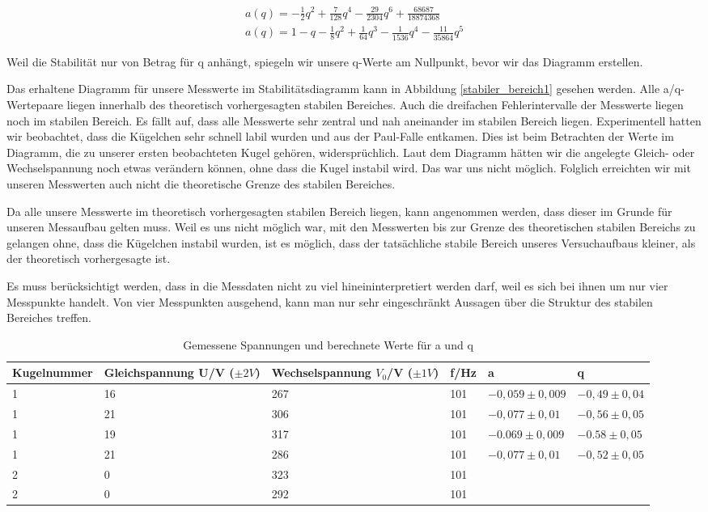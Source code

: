 \documentclass[10pt,a4paper]{article}
\begin{document}
\begin{align}
	a(q) = - \frac{1}{2} q^2 + \frac{7}{128} q^4 - \frac{29}{2304} q^6 + \frac{68687}{18874368}\\
	a(q) = 1-q-\frac{1}{8} q^2 + \frac{1}{64} q^3 - \frac{1}{1536} q^4 - \frac{11}{35864} q^5	
\end{align}

Weil die Stabilität nur von Betrag für q anhängt, spiegeln wir unsere q-Werte am Nullpunkt, bevor wir das Diagramm erstellen. 

Das erhaltene Diagramm für unsere Messwerte im Stabilitätsdiagramm kann in Abbildung \ref{stabiler_bereich1} gesehen werden. Alle a/q-Wertepaare liegen innerhalb des theoretisch vorhergesagten stabilen Bereiches. Auch die dreifachen Fehlerintervalle der Messwerte liegen noch im stabilen Bereich. Es fällt auf, dass alle Messwerte sehr zentral und nah aneinander im stabilen Bereich liegen. Experimentell hatten wir beobachtet, dass die Kügelchen sehr schnell labil wurden und aus der Paul-Falle entkamen. Dies ist beim Betrachten der Werte im Diagramm, die zu unserer ersten beobachteten Kugel gehören, widersprüchlich. Laut dem Diagramm hätten wir die angelegte Gleich- oder Wechselspannung noch etwas verändern können, ohne dass die Kugel instabil wird. Das war uns nicht möglich. Folglich erreichten wir mit unseren Messwerten auch nicht die theoretische Grenze des stabilen Bereiches.

Da alle unsere Messwerte im theoretisch vorhergesagten stabilen Bereich liegen, kann angenommen werden, dass dieser im Grunde für unseren Messaufbau gelten muss. Weil es uns nicht möglich war, mit den Messwerten bis zur Grenze des theoretischen stabilen Bereichs zu gelangen ohne, dass die Kügelchen instabil wurden, ist es möglich, dass der tatsächliche stabile Bereich unseres Versuchaufbaus kleiner, als der theoretisch vorhergesagte ist. 

Es muss berücksichtigt werden, dass in die Messdaten nicht zu viel hineininterpretiert werden darf, weil es sich bei ihnen um nur vier Messpunkte handelt. Von vier Messpunkten ausgehend, kann man nur sehr eingeschränkt Aussagen über die Struktur des stabilen Bereiches treffen. 

\begin{table}[h!]
	\centering
	\begin{tabular}{|l|l|l|l|l|l|}\hline
		Kugelnummer & Gleichspannung U/V ($\pm 2V$) & Wechselspannung $V_0$/V ($\pm 1V$)& f/Hz & a & q\\\hline
		1 & 16 & 267 & 101 & $-0,059 \pm 0,009$ & $-0,49 \pm 0,04$\\
		1 & 21 & 306 & 101 & $-0,077 \pm 0,01$ & $-0,56 \pm 0,05$\\
		1 & 19 & 317 & 101 & $-0.069 \pm 0,009$ & $-0.58 \pm 0,05$\\
		1 & 21 & 286 & 101 & $-0,077 \pm 0,01$ & $-0,52 \pm 0,05$\\
		2 & 0 & 323 & 101 &&\\
		2 & 0 & 292 & 101 &&\\\hline
	\end{tabular}
	\caption{Gemessene Spannungen und berechnete Werte für a und q}
	\label{gefangen2}
\end{table}
\end{document}
